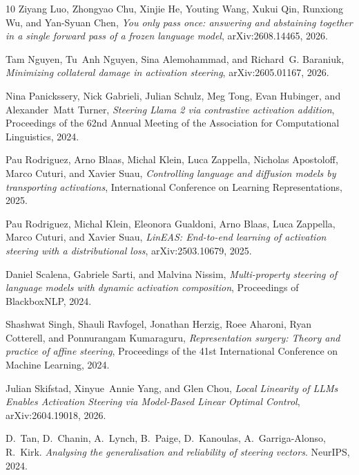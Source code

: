 \documentclass{article}
\begin{document}
\begin{thebibliography}{10}
Ziyang Luo, Zhongyao Chu, Xinjie He, Youting Wang, Xukui Qin, Runxiong Wu, and
  Yan-Syuan Chen, \emph{You only pass once: answering and abstaining together
  in a single forward pass of a frozen language model}, arXiv:2608.14465, 2026.

Tam Nguyen, Tu~Anh Nguyen, Sina Alemohammad, and Richard~G. Baraniuk,
  \emph{Minimizing collateral damage in activation steering}, arXiv:2605.01167,
  2026.

Nina Panickssery, Nick Gabrieli, Julian Schulz, Meg Tong, Evan Hubinger, and
  Alexander~Matt Turner, \emph{Steering Llama 2 via contrastive activation
  addition}, Proceedings of the 62nd Annual Meeting of the Association for
  Computational Linguistics, 2024.

Pau Rodriguez, Arno Blaas, Michal Klein, Luca Zappella, Nicholas Apostoloff,
  Marco Cuturi, and Xavier Suau, \emph{Controlling language and diffusion models
  by transporting activations}, International Conference on Learning
  Representations, 2025.

Pau Rodriguez, Michal Klein, Eleonora Gualdoni, Arno Blaas, Luca Zappella, Marco
  Cuturi, and Xavier Suau, \emph{LinEAS: End-to-end learning of activation
  steering with a distributional loss}, arXiv:2503.10679, 2025.

Daniel Scalena, Gabriele Sarti, and Malvina Nissim, \emph{Multi-property
  steering of language models with dynamic activation composition}, Proceedings
  of BlackboxNLP, 2024.

Shashwat Singh, Shauli Ravfogel, Jonathan Herzig, Roee Aharoni, Ryan Cotterell,
  and Ponnurangam Kumaraguru, \emph{Representation surgery: Theory and practice
  of affine steering}, Proceedings of the 41st International Conference on
  Machine Learning, 2024.

Julian Skifstad, Xinyue~Annie Yang, and Glen Chou, \emph{Local Linearity of
  LLMs Enables Activation Steering via Model-Based Linear Optimal Control},
  arXiv:2604.19018, 2026.

D.~Tan, D.~Chanin, A.~Lynch, B.~Paige, D.~Kanoulas, A.~Garriga-Alonso, R.~Kirk.
  \emph{Analysing the generalisation and reliability of steering vectors}.
  NeurIPS, 2024.


\end{thebibliography}
\end{document}
